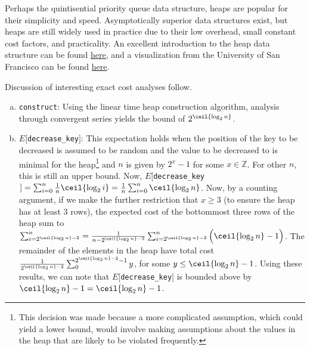 Perhaps the quintisential priority queue data structure, heaps are popular for their simplicity and speed.  Asymptotically superior data structures exist, but heaps are still widely used in practice due to their low overhead, small constant cost factors, and practicality.  An excellent introduction to the heap data structure can be found \href{http://www.cprogramming.com/tutorial/computersciencetheory/heap.html}{here}, and a visualization from the University of San Francisco can be found \href{http://www.cs.usfca.edu/~galles/visualization/Heap.html}{here}.

Discussion of interesting exact cost analyses follow.

\begin{enumerate}[a):]

\item \texttt{construct}: Using the linear time heap construction algorithm, analysis through convergent series yields the bound of $2^{\ceil{\log_2 n}}$.

\item $E[$\texttt{decrease\_key}$]$: This expectation holds when the position of the key to be decreased is assumed to be random and the value to be decreased to is minimal for the heap\footnote{This decision was made because a more complicated assumption, which could yield a lower bound, would involve making assumptions about the values in the heap that are likely to be violated frequently.} and $n$ is given by $2^x - 1$ for some $x \in \mathbb{Z}$.  For other $n$, this is still an upper bound.  Now, $E[$\texttt{decrease\_key}$] = \sum_{i = 0}^n \frac{1}{n} \ceil{\log_2 i} = \frac{1}{n} \sum_{i = 0}^n \ceil{\log_2 n}$.  
Now, by a counting argument, if we make the further restriction that $x \geq 3$ (to ensure the heap has at least 3 rows), the expected cost of the bottommost three rows of the heap sum to $\sum_{i = 2 ^ {\ceil{\log_2 n} - 2}}^n = \frac{1}{n - 2 ^ {\ceil{\log_2 n} - 2}} \sum_{i = 2 ^ {\ceil{\log_2 n} - 2}}^n \Big( \ceil{\log_2 n} - 1 \Big)$.  
The remainder of the elements in the heap have total cost $\frac{1}{2 ^ {\ceil{\log_2 n} - 2}} \sum_0^{2 ^ {\ceil{\log_2 n} - 2} - 1} y$, for some $y \leq \ceil{\log_2 n} - 1$.  Using these results, we can note that $E[$\texttt{decrease\_key}$]$ is bounded above by $\ceil{\log_2 n} - 1 = \ceil{\log_2 n} - 1$.

\end{enumerate}
